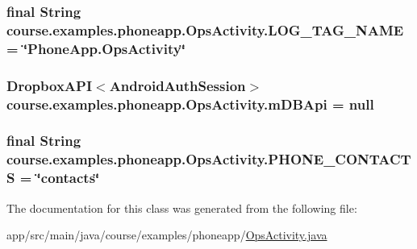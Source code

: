 \subsubsection[{L\+O\+G\+\_\+\+T\+A\+G\+\_\+\+N\+A\+M\+E}]{\setlength{\rightskip}{0pt plus 5cm}final String course.\+examples.\+phoneapp.\+Ops\+Activity.\+L\+O\+G\+\_\+\+T\+A\+G\+\_\+\+N\+A\+M\+E = \char`\"{}Phone\+App.\+Ops\+Activity\char`\"{}\hspace{0.3cm}{\ttfamily [static]}}\label{classcourse_1_1examples_1_1phoneapp_1_1_ops_activity_a00103d05c714f90b383b1a449576484a}
\hypertarget{classcourse_1_1examples_1_1phoneapp_1_1_ops_activity_afa9dcbfe8d531688656b8ee3042ccba6}{}
\subsubsection[{m\+D\+B\+Api}]{\setlength{\rightskip}{0pt plus 5cm}Dropbox\+A\+P\+I$<$Android\+Auth\+Session$>$ course.\+examples.\+phoneapp.\+Ops\+Activity.\+m\+D\+B\+Api = null}\label{classcourse_1_1examples_1_1phoneapp_1_1_ops_activity_afa9dcbfe8d531688656b8ee3042ccba6}
\hypertarget{classcourse_1_1examples_1_1phoneapp_1_1_ops_activity_a6bbe27893d347a4f66c9bac0e2dcc80b}{}
\subsubsection[{P\+H\+O\+N\+E\+\_\+\+C\+O\+N\+T\+A\+C\+T\+S}]{\setlength{\rightskip}{0pt plus 5cm}final String course.\+examples.\+phoneapp.\+Ops\+Activity.\+P\+H\+O\+N\+E\+\_\+\+C\+O\+N\+T\+A\+C\+T\+S = \char`\"{}contacts\char`\"{}\hspace{0.3cm}{\ttfamily [static]}}\label{classcourse_1_1examples_1_1phoneapp_1_1_ops_activity_a6bbe27893d347a4f66c9bac0e2dcc80b}


The documentation for this class was generated from the following file\+:\begin{DoxyCompactItemize}
\item 
app/src/main/java/course/examples/phoneapp/\hyperlink{_ops_activity_8java}{Ops\+Activity.\+java}\end{DoxyCompactItemize}
